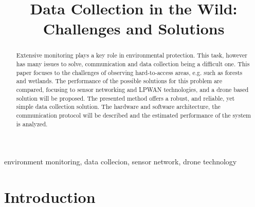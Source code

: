 \documentclass[conference]{IEEEtran}
\begin{document}
\title{Data Collection in the Wild: Challenges and Solutions}

\author{
\and
{}
\and
{}
}

\maketitle

\begin{abstract}

Extensive monitoring plays a key role in environmental protection. This task, however
has many issues to solve, communication and data collection being a difficult one.
This paper focuses to the challenges of observing hard-to-access areas, e.g.
such as forests and wetlands. The performance of the possible solutions for this problem
are compared, focusing to sensor networking and LPWAN technologies, and a drone based solution
will be proposed. The presented method offers a robust, and reliable, yet simple
data collection solution. The hardware and software architecture, the communication protocol
will be described and the estimated performance of the system is analyzed.


\end{abstract}

\begin{IEEEkeywords}
environment monitoring, data collecion, sensor network, drone technology
\end{IEEEkeywords}

\section{Introduction}
\end{document}
